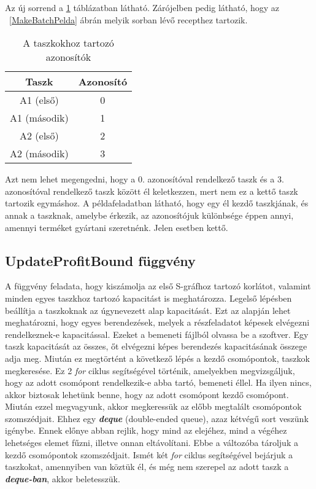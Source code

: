 Az új sorrend a \ref{tab:table1} táblázatban látható.
Zárójelben pedig látható, hogy az ~\ref{MakeBatchPelda} ábrán melyik sorban lévő recepthez tartozik.
\begin{table}[H]
  \begin{center}
  	\caption{A taszkokhoz tartozó azonosítók}
  	\captionsetup[table]{skip=10pt}
    \label{tab:table1}
    \begin{tabular}{|c|c|}
      \textbf{Taszk} & \textbf{Azonosító} \\     
      \hline
      A1 (első) & 0\\
      A1 (második) & 1\\
      A2 (első) & 2\\
      A2 (második) & 3\\
    \end{tabular}
  \end{center}
\end{table}

Azt nem lehet megengedni, hogy a 0. azonosítóval rendelkező taszk és a 3. azonosítóval rendelkező taszk között él keletkezzen, mert nem ez a kettő taszk tartozik egymáshoz.
A példafeladatban látható, hogy egy él kezdő taszkjának, és annak a taszknak, amelybe érkezik, az azonosítójuk különbsége éppen annyi, amennyi terméket gyártani szeretnénk.
Jelen esetben kettő. 

\subsection{UpdateProfitBound függvény}
A függvény feladata, hogy kiszámolja az első S-gráfhoz tartozó korlátot, valamint minden egyes taszkhoz tartozó kapacitást is meghatározza.
Legelső lépésben beállítja a taszkoknak az úgynevezett alap kapacitását.
Ezt az alapján lehet meghatározni, hogy egyes berendezések, melyek a részfeladatot képesek elvégezni rendelkeznek-e kapacitással.
Ezeket a bemeneti fájlból olvassa be a szoftver.
Egy taszk kapacitását az összes, őt elvégezni képes berendezés kapacitásának összege adja meg.
Miután ez megtörtént a következő lépés a kezdő csomópontok, taszkok megkeresése.
Ez 2 \textit{for} ciklus segítségével történik, amelyekben megvizsgáljuk, hogy az adott csomópont rendelkezik-e abba tartó, bemeneti éllel.
Ha ilyen nincs, akkor biztosak lehetünk benne, hogy az adott csomópont kezdő csomópont.
Miután ezzel megvagyunk, akkor megkeressük az előbb megtalált csomópontok szomszédjait.
Ehhez egy \textbf{\textit{deque}} (double-ended queue), azaz kétvégű sort veszünk igénybe.
Ennek előnye abban rejlik, hogy mind az elejéhez, mind a végéhez lehetséges elemet fűzni, illetve onnan eltávolítani.
Ebbe a változóba tároljuk a kezdő csomópontok szomszédjait.
Ismét két \textit{for} ciklus segítségével bejárjuk a taszkokat, amennyiben van köztük él, és még nem szerepel az adott taszk a \textbf{\textit{deque-ban}}, akkor beletesszük.

